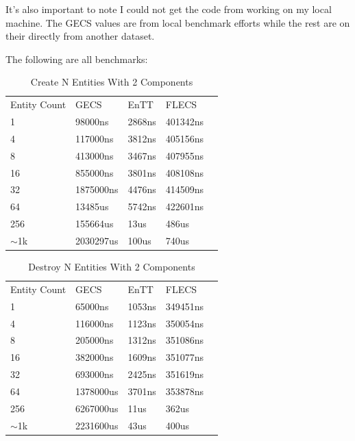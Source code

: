 It's also important to note I could not get the code from \cite{ECS_benchmark} working on my local machine. The GECS values are from local benchmark efforts while the rest are on their directly from another dataset.

The following are all benchmarks:

\begin{table}[htbp]
    \centering
    \begin{tabular}{lllll}
        Entity Count & GECS      & EnTT   & FLECS    &  \\
        1            & 98000ns   & 2868ns & 401342ns &  \\
        4            & 117000ns  & 3812ns & 405156ns &  \\
        8            & 413000ns  & 3467ns & 407955ns &  \\
        16           & 855000ns  & 3801ns & 408108ns &  \\
        32           & 1875000ns & 4476ns & 414509ns &  \\
        64           & 13485us   & 5742ns & 422601ns &  \\
        256          & 155664us  & 13us   & 486us    &  \\
        $\sim$1k     & 2030297us & 100us  & 740us    & 
    \end{tabular}
    \caption{Create N Entities With 2 Components}    
\end{table}

\begin{table}[H]
    \centering
    \begin{tabular}{lllll}
        Entity Count & GECS      & EnTT   & FLECS    &  \\
        1            & 65000ns   & 1053ns & 349451ns &  \\
        4            & 116000ns  & 1123ns & 350054ns &  \\
        8            & 205000ns  & 1312ns & 351086ns &  \\
        16           & 382000ns  & 1609ns & 351077ns &  \\
        32           & 693000ns & 2425ns & 351619ns &  \\
        64           & 1378000us   & 3701ns & 353878ns &  \\
        256          & 6267000us  & 11us   & 362us    &  \\
        $\sim$1k     & 2231600us & 43us  & 400us    & 
    \end{tabular}
    \label{tab:entt_del}
    \caption{Destroy N Entities With 2 Components}    
\end{table}

